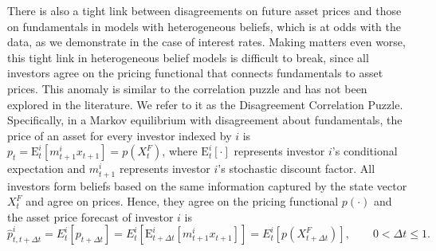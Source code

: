\documentclass[preprint,11pt,authoryear]{elsarticle}
\theoremstyle{plain}
\begin{document}
There is also a tight link between disagreements on future asset prices and those on fundamentals in models with heterogeneous beliefs, which is at odds with the data, as we demonstrate in the case of interest rates. Making matters even worse, this tight link in heterogeneous belief models is difficult to break, since all investors agree on the pricing functional that connects fundamentals to asset prices. This anomaly is similar to the correlation puzzle and has not been explored in the literature. We refer to it as the Disagreement Correlation Puzzle. Specifically, in a Markov equilibrium with disagreement about fundamentals, the price of an asset for every investor indexed by $i$ is $p_t = \mathrm{E}^i_{t} \left[ m^i_{t+1} x_{t+1} \right] = p \left(X_t^F \right)$,
where $\mathrm{E}^i_{t} \left[ \cdot \right]$ represents investor $i$'s conditional expectation and $m^i_{t+1}$ represents investor $i$'s stochastic discount factor. All investors form beliefs based on the same information captured by the state vector $X_t^F$ and agree on prices. Hence, they agree on the pricing functional $p(\cdot)$ and the asset price forecast of investor $i$ is  
%
\begin{equation} \label{eq:apforecast}
	\hat{p}^i_{t,t+\Delta t} = E^i_{t} \left[  p_{t+\Delta t}  \right] =  E^i_{t} \left[ \mathrm{E}^i_{t+\Delta t}  \left[ m^i_{t+1} x_{t+1} \right]  \right] = E^i_{t} \left[ p \left( X^F_{t+\Delta t} \right) \right],\qquad 0  < \Delta t \leq 1.
\end{equation}
%
\end{document}
